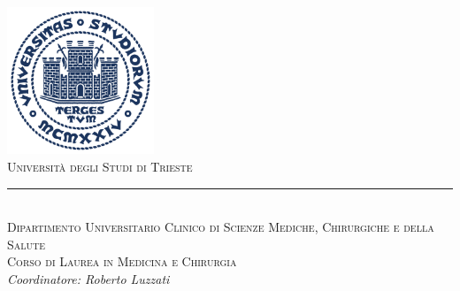 
\begin{titlepage} %
\null\vfill
\begin{center}
\large
\sffamily
	\newcommand{\HRule}{\rule{\linewidth}{0.5mm}} %
	
	\center %
	
	
	\includegraphics[width=0.33\textwidth]{Figure/logoUniTs_tondo.pdf}\\[0.5cm] %
	 
	
	
	\textsc{\LARGE Universit\`a degli Studi di Trieste}\\
	\HRule\\[0.5cm] %
	
	\textsc{\Large Dipartimento Universitario Clinico di Scienze Mediche, Chirurgiche e della Salute}\\[0.5cm] %
	
	\textsc{\large Corso di Laurea in Medicina e Chirurgia}\\
	\textit{Coordinatore: Roberto Luzzati} \\ [0.5cm] %
	

\end{center}
\end{titlepage}
